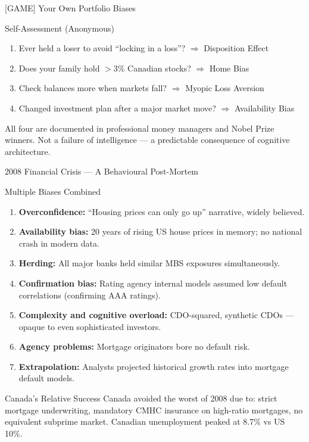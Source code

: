 \documentclass[aspectratio=169]{beamer}
\begin{document}
\begin{frame}{[GAME] Your Own Portfolio Biases}
\begin{alertblock}{Self-Assessment (Anonymous)}
\begin{enumerate}\small
  \item Ever held a loser to avoid ``locking in a loss''? \textcolor{berust}{$\Rightarrow$ Disposition Effect}
  \item Does your family hold $>$3\% Canadian stocks? \textcolor{berust}{$\Rightarrow$ Home Bias}
  \item Check balances more when markets fall? \textcolor{berust}{$\Rightarrow$ Myopic Loss Aversion}
  \item Changed investment plan after a major market move? \textcolor{berust}{$\Rightarrow$ Availability Bias}
\end{enumerate}
\end{alertblock}
All four are documented in professional money managers and Nobel Prize winners. Not a failure of intelligence --- a predictable consequence of cognitive architecture.
\end{frame}

\begin{frame}{2008 Financial Crisis --- A Behavioural Post-Mortem}
\begin{block}{Multiple Biases Combined}
\begin{enumerate}[<+->]
  \item \textbf{Overconfidence:} ``Housing prices can only go up'' narrative, widely believed.
  \item \textbf{Availability bias:} 20 years of rising US house prices in memory; no national crash in modern data.
  \item \textbf{Herding:} All major banks held similar MBS exposures simultaneously.
  \item \textbf{Confirmation bias:} Rating agency internal models assumed low default correlations (confirming AAA ratings).
  \item \textbf{Complexity and cognitive overload:} CDO-squared, synthetic CDOs --- opaque to even sophisticated investors.
  \item \textbf{Agency problems:} Mortgage originators bore no default risk.
  \item \textbf{Extrapolation:} Analysts projected historical growth rates into mortgage default models.
\end{enumerate}
\end{block}
\begin{exampleblock}{Canada's Relative Success}
Canada avoided the worst of 2008 due to: strict mortgage underwriting, mandatory CMHC insurance on high-ratio mortgages, no equivalent subprime market. Canadian unemployment peaked at 8.7\% vs US 10\%.
\end{exampleblock}
\end{frame}
\end{document}
